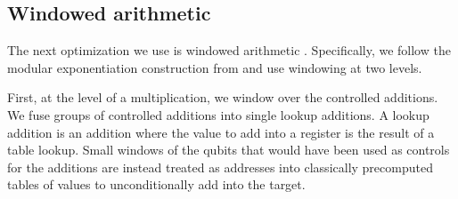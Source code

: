 \documentclass[a4paper, onecolumn, accepted=2021-03-29]{quantumarticle}
\begin{document}
\subsection{Windowed arithmetic}

The next optimization we use is windowed arithmetic \cite{van2005fastexponentiation,kutin2006shor,gidney2019windowedarithmetic}.
Specifically, we follow the modular exponentiation construction from \cite{gidney2019windowedarithmetic} and use windowing at two levels.

First, at the level of a multiplication, we window over the controlled additions.
We fuse groups of controlled additions into single lookup additions.
A lookup addition is an addition where the value to add into a register is the result of a table lookup.
Small windows of the qubits that would have been used as controls for the additions are instead treated as addresses into classically precomputed tables of values to unconditionally add into the target.
\end{document}
